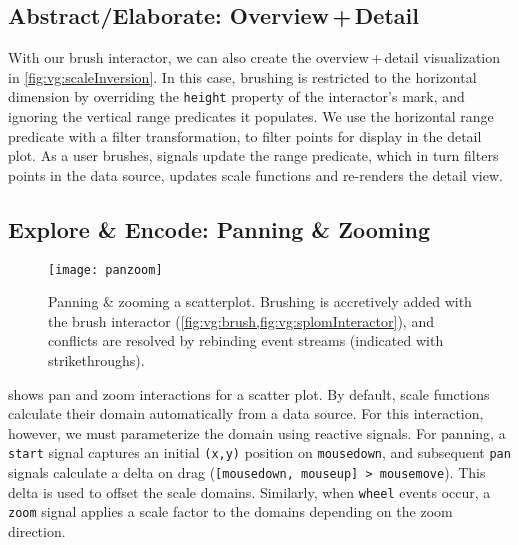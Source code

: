 \vspace{-10pt}

\subsection{Abstract/Elaborate: Overview\,+\,Detail}

\vspace{-7pt}

With our brush interactor, we can also create the overview\,+\,detail
visualization in \cref{fig:vg:scaleInversion}. In this case, brushing is
restricted to the horizontal dimension by overriding the \texttt{height}
property of the interactor's mark, and ignoring the vertical range predicates it
populates. We use the horizontal range predicate with a filter transformation,
to filter points for display in the detail plot. As a user brushes, signals
update the range predicate, which in turn filters points in the data source,
updates scale functions and re-renders the detail view.

\vspace{-10pt}

\subsection{Explore \& Encode: Panning \& Zooming}

\vspace{-7pt}

\begin{figure}[b!]
  \centering
  \texttt{[image: panzoom]}
  \caption{Panning \& zooming a scatterplot. Brushing is accretively added with
  the brush interactor (\cref{fig:vg:brush,fig:vg:splomInteractor}), and
  conflicts are resolved by rebinding event streams (indicated with
  strikethroughs).}
  \label{fig:vg:panzoom}
\end{figure}

 shows pan and zoom interactions for a scatter plot. By
default, scale functions calculate their domain automatically from a data
source. For this interaction, however, we must parameterize the domain using
reactive signals. For panning, a \texttt{start} signal captures an initial
\texttt{(x,y)} position on \texttt{mousedown}, and subsequent \texttt{pan}
signals calculate a delta on drag (\texttt{[mousedown, mouseup] > mousemove}).
This delta is used to offset the scale domains. Similarly, when \texttt{wheel}
events occur, a \texttt{zoom} signal applies a scale factor to the domains
depending on the zoom direction.

